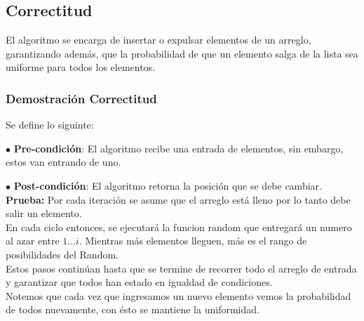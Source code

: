 \documentclass[11pt]{article}
\begin{document}
\subsection{Correctitud}
El algoritmo se encarga de insertar o expulsar elementos de un arreglo, garantizando además, que la probabilidad de que un elemento salga de la lista sea uniforme para todos los elementos.
\subsubsection{Demostración Correctitud}
Se define lo siguinte:

$\bullet$ \textbf{Pre-condición}: El algoritmo recibe una entrada de elementos, sin embargo, estos van entrando de uno.

$\bullet$ \textbf{Post-condición}: El algoritmo retorna la posición que se debe cambiar.\\

\textbf{Prueba:} Por cada iteración se asume que el arreglo está lleno por lo tanto debe salir un elemento.\\En cada ciclo entonces, se ejecutará la funcion random que entregará un numero al azar entre $1 ...i$. Mientras más elementos lleguen, más es el rango de posibilidades del Random.\\
Estos pasos continúan hasta que se termine de recorrer todo el arreglo de entrada y garantizar que todos han estado en igualdad de condiciones.\\Notemos que cada vez que ingresamos un nuevo elemento vemos la probabilidad de todos nuevamente, con ésto se mantiene la uniformidad.
\end{document}
